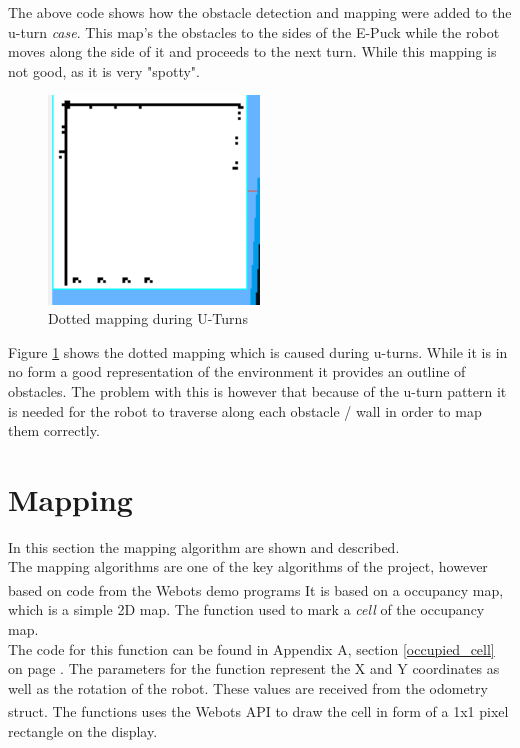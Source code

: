 The above code shows how the obstacle detection and mapping were added to the u-turn \textit{case}.
This map's the obstacles to the sides of the E-Puck while the robot moves along the side of it and proceeds to the next turn. While this mapping is not good, as it is very "spotty".

\begin{figure}[h]
\centering
\includegraphics[width = 0.5\textwidth]{../../figures/map_results/dotted_uturn_mapping.png}
\caption{Dotted mapping during U-Turns}
\label{dotted_uturn}
\end{figure}

Figure \ref{dotted_uturn} shows the dotted mapping which is caused during u-turns. While it is in no form a good representation of the environment it provides an outline of obstacles. The problem with this is however that because of the u-turn pattern it is needed for the robot to traverse along each obstacle / wall in order to map them correctly.

\section{Mapping}
In this section the mapping algorithm are shown and described. \\
The mapping algorithms are one of the key algorithms of the project, however based on code from the Webots\textsuperscript{\texttrademark} demo programs It is based on a occupancy map, which is a simple 2D map. The function used to mark a \textit{cell} of the occupancy map.\\
The code for this function can be found in Appendix A, section \ref{occupied_cell} on page \pageref{occupied_cell}.
The parameters for the function represent the X and Y coordinates as well as the rotation of the robot. These values are received from the odometry struct.
The functions uses the Webots\textsuperscript{\texttrademark}  API to draw the cell in form of a 1x1 pixel rectangle on the display.

